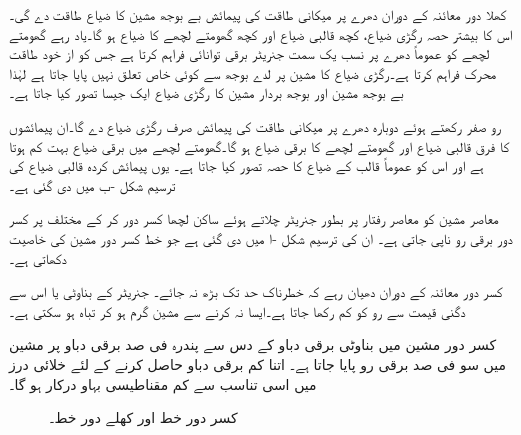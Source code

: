 کھلا دور معائنہ کے دوران دھرے پر  میکانی طاقت  کی پیمائش بے بوجھ مشین کا ضیاع طاقت  دے گی۔ اس کا بیشتر حصہ رگڑی ضیاع، کچھ قالبی ضیاع  اور کچھ گھومتے لچھے کا ضیاع  ہو گا۔یاد رہے  گھومتے لچھے کو عموماً دھرے پر نسب یک سمت  جنریٹر برقی توانائی فراہم کرتا ہے جس کو از خود  طاقت محرک فراہم کرتا ہے۔رگڑی ضیاع کا مشین پر لدے بوجھ سے کوئی خاص تعلق نہیں پایا جاتا ہے لہٰذا  بے بوجھ مشین اور بوجھ بردار مشین  کا رگڑی ضیاع ایک جیسا تصور کیا جاتا ہے۔

رو   صفر رکھتے ہوئے دوبارہ دھرے پر میکانی طاقت  کی پیمائش صرف رگڑی ضیاع دے گا۔ان پیمائشوں کا فرق   قالبی ضیاع  اور گھومتے لچھے کا برقی ضیاع  ہو گا۔گھومتے لچھے میں برقی ضیاع بہت کم ہوتا ہے اور اس کو عموماً قالب کے ضیاع کا حصہ تصور کیا جاتا ہے۔ یوں  پیمائش کردہ قالبی ضیاع کی ترسیم شکل  -ب میں دی گئی ہے۔

معاصر مشین کو معاصر رفتار پر بطور جنریٹر  چلاتے ہوئے  ساکن لچھا کسر دور کر کے مختلف  پر کسر دور برقی رو  ناپی جاتی ہے۔ ان کی ترسیم شکل -ا میں دی گئی ہے جو خط کسر دور مشین کی خاصیت دکھاتی ہے۔ 

 کسر دور معائنہ کے دوران  دھیان رہے  کہ   خطرناک حد تک  بڑھ نہ جائے۔  جنریٹر کے بناوٹی   یا اس سے دگنی قیمت  سے رو کو  کم رکھا جاتا ہے۔ایسا نہ کرنے سے مشین گرم ہو کر تباہ ہو سکتی ہے۔

کسر دور مشین میں بناوٹی برقی دباو کے دس سے پندرہ فی صد برقی دباو پر مشین میں سو فی صد برقی رو پایا جاتا ہے۔ اتنا کم برقی دباو حاصل کرنے کے لئے خلائی درز میں اسی تناسب سے  کم مقناطیسی بہاو درکار ہو گا۔ 
\begin{figure}
\centering
\begin{subfigure}{0.45\textwidth}
\centering
{}%
\caption{}
\end{subfigure}%
\begin{subfigure}{0.45\textwidth}
\centering
{}
\caption{}
\end{subfigure}%
\caption{کسر دور خط اور کھلے دور خط۔}
\label{شکل_معاصر_کسر_دور_اور_کھلے_دور_خط}
\end{figure}

